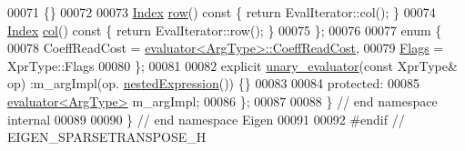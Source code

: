 \begin{DoxyCode}
00071       \{\}
00072       
00073       \hyperlink{namespace_eigen_a62e77e0933482dafde8fe197d9a2cfde}{Index} \hyperlink{group___sparse_core___module_ac0a5563ed3f243f013fb9d2c17e230d0}{row}()\textcolor{keyword}{ const }\{ \textcolor{keywordflow}{return} EvalIterator::col(); \}
00074       \hyperlink{namespace_eigen_a62e77e0933482dafde8fe197d9a2cfde}{Index} \hyperlink{group___sparse_core___module_a8f4eaa3c3921ef3823ffc69ebcc356af}{col}()\textcolor{keyword}{ const }\{ \textcolor{keywordflow}{return} EvalIterator::row(); \}
00075     \};
00076     
00077     \textcolor{keyword}{enum} \{
00078       CoeffReadCost = \hyperlink{struct_eigen_1_1internal_1_1evaluator}{evaluator<ArgType>::CoeffReadCost},
00079       \hyperlink{group___sparse_core___module_a726a12d2ba40a5f476c247c8f6db39d9ab5d909e7026be6ee6dccbbc629842a93}{Flags} = XprType::Flags
00080     \};
00081     
00082     \textcolor{keyword}{explicit} \hyperlink{struct_eigen_1_1internal_1_1unary__evaluator}{unary\_evaluator}(\textcolor{keyword}{const} XprType& op) :m\_argImpl(op.
      \hyperlink{group___core___module_a72aefbf67f5e3caf62a99f73409b4a63}{nestedExpression}()) \{\}
00083 
00084   \textcolor{keyword}{protected}:
00085     \hyperlink{struct_eigen_1_1internal_1_1evaluator}{evaluator<ArgType>} m\_argImpl;
00086 \};
00087 
00088 \} \textcolor{comment}{// end namespace internal}
00089 
00090 \} \textcolor{comment}{// end namespace Eigen}
00091 
00092 \textcolor{preprocessor}{#endif // EIGEN\_SPARSETRANSPOSE\_H}
\end{DoxyCode}
